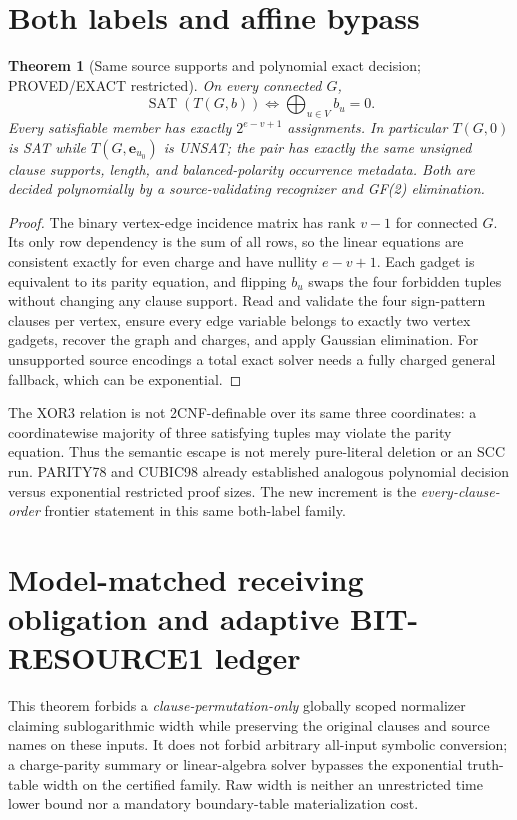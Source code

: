 \documentclass[11pt]{article}
\newtheorem{theorem}{Theorem}
\begin{document}
\section{Both labels and affine bypass}
\begin{theorem}[Same source supports and polynomial exact decision; PROVED/EXACT restricted]
On every connected $G$,
\[
\operatorname{SAT}(T(G,b))\iff\bigoplus_{u\in V}b_u=0.
\]
Every satisfiable member has exactly $2^{e-v+1}$ assignments. In particular $T(G,0)$ is SAT while $T(G,\mathbf e_{u_0})$ is UNSAT; the pair has exactly the same unsigned clause supports, length, and balanced-polarity occurrence metadata. Both are decided polynomially by a source-validating recognizer and GF(2) elimination.
\end{theorem}
\begin{proof}
The binary vertex-edge incidence matrix has rank $v-1$ for connected $G$. Its only row dependency is the sum of all rows, so the linear equations are consistent exactly for even charge and have nullity $e-v+1$. Each gadget is equivalent to its parity equation, and flipping $b_u$ swaps the four forbidden tuples without changing any clause support. Read and validate the four sign-pattern clauses per vertex, ensure every edge variable belongs to exactly two vertex gadgets, recover the graph and charges, and apply Gaussian elimination. For unsupported source encodings a total exact solver needs a fully charged general fallback, which can be exponential.
\end{proof}
The XOR3 relation is not 2CNF-definable over its same three coordinates: a coordinatewise majority of three satisfying tuples may violate the parity equation. Thus the semantic escape is not merely pure-literal deletion or an SCC run. PARITY78 and CUBIC98 already established analogous polynomial decision versus exponential restricted proof sizes. The new increment is the \emph{every-clause-order} frontier statement in this same both-label family.

\section{Model-matched receiving obligation and adaptive BIT-RESOURCE1 ledger}
This theorem forbids a \emph{clause-permutation-only} globally scoped normalizer claiming sublogarithmic width while preserving the original clauses and source names on these inputs. It does not forbid arbitrary all-input symbolic conversion; a charge-parity summary or linear-algebra solver bypasses the exponential truth-table width on the certified family. Raw width is neither an unrestricted time lower bound nor a mandatory boundary-table materialization cost.
\end{document}
